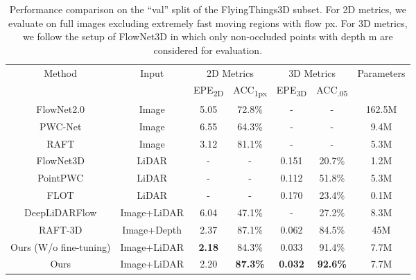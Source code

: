 \documentclass[10pt,twocolumn,letterpaper]{article}
\begin{document}
\begin{table*}
    \centering
    \begin{tabular}{c|c|cc|cc|c}
    \hline
    \multirow{2}{*}{Method} & \multirow{2}{*}{Input} & \multicolumn{2}{c|}{2D Metrics} & \multicolumn{2}{c|}{3D Metrics} & \multirow{2}{*}{Parameters} \\
    & & EPE\textsubscript{2D} & ACC\textsubscript{1px} & EPE\textsubscript{3D} & ACC\textsubscript{.05} \\
    \hline
    FlowNet2.0 \cite{ilg2017flownet2} & Image & 5.05 & 72.8\% & - & - & 162.5M \\
    PWC-Net \cite{sun2018pwc}         & Image & 6.55 & 64.3\% & - & - & 9.4M \\
    RAFT \cite{teed2020raft}          & Image & 3.12 & 81.1\% & - & - & 5.3M \\
    \hline
    FlowNet3D \cite{liu2019flownet3d} & LiDAR & - & - & 0.151 & 20.7\% & 1.2M \\
    PointPWC \cite{wu2019pointpwc}    & LiDAR & - & - & 0.112 & 51.8\% & 5.3M \\
    FLOT \cite{puy2020flot}           & LiDAR & - & - & 0.170 & 23.4\% & 0.1M \\
    \hline
    DeepLiDARFlow \cite{rishav2020deeplidarflow} & Image+LiDAR & 6.04 & 47.1\% & - & 27.2\% & 8.3M \\
    RAFT-3D \cite{teed2021raft3d}                & Image+Depth & 2.37 & 87.1\% & 0.062 & 84.5\% & 45M \\
    \hline
    Ours (W/o fine-tuning) & Image+LiDAR & \textbf{2.18} & 84.3\% & 0.033 & 91.4\% & 7.7M \\
    Ours & Image+LiDAR & 2.20 & \textbf{87.3\%} & \textbf{0.032} & \textbf{92.6\%} & 7.7M \\
    \end{tabular}
    
    \vspace{-5pt}
    \caption{Performance comparison on the ``val'' split of the FlyingThings3D subset. For 2D metrics, we evaluate on full images excluding extremely fast moving regions with flow px. For 3D metrics, we follow the setup of FlowNet3D in which only non-occluded points with depth m are considered for evaluation.}
    \vspace{-10pt}
    \label{tab:main-things}
\end{table*}
\end{document}

